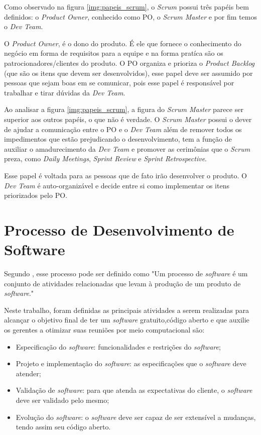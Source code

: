 Como observado na figura \ref{img:papeis_scrum}, o \textit{Scrum} possui três papéis bem definidos: o \textit{Product Owner}, conhecido como PO, o \textit{Scrum Master} e por fim temos o \textit{Dev Team}. 


O \textit{Product Owner}, é o dono do produto. É ele que fornece o conhecimento do negócio em forma de requisitos para a equipe e na forma pratíca são os patrocionadores/clientes do produto. O PO organiza e prioriza o \textit{Product Backlog} (que são os itens que devem ser desenvolvidos), esse papel deve ser assumido por pessoas que sejam boas em se comunicar, pois esse papel é responsável por trabalhar e tirar dúvidas da \textit{Dev Team}.


Ao analisar a figura \ref{img:papeis_scrum}, a figura do \textit{Scrum Master} parece ser superior aos outros papéis, o que não é verdade. O \textit{Scrum Master} possui o dever de ajudar a comunicação entre o PO e o \textit{Dev Team} além de remover todos os impedimentos que estão prejudicando o desenvolvimento, tem a função de auxiliar o amadurecimento da \textit{Dev Team} e promover as cerimônias que o \textit{Scrum} preza, como \textit{Daily Meetings}, \textit{Sprint Review} e \textit{Sprint Retrospective}.


Esse papel é voltada para as pessoas que de fato irão desenvolver o produto. O \textit{Dev Team} é auto-organizável e decide entre si como implementar os itens priorizados pelo PO.

\section{Processo de Desenvolvimento de Software}
\label{sec:processo_de_desenvolvimento_de_software}

Segundo \cite{sommerville}, esse processo pode ser definido como "Um processo de \textit{software} é um conjunto de atividades relacionadas que levam à produção de um produto de \textit{software}."

Neste trabalho, foram definidas as principais atividades a serem realizadas para alcançar o objetivo final de ter um \textit{software} gratuito,código aberto e que auxilie os gerentes a otimizar suas reuniões por meio computacional são:

\begin{itemize}
    \item Especificação do \textit{software}: funcionalidades e restrições do \textit{software};
    \item Projeto e implementação do \textit{software}: as especificações que o \textit{software} deve atender;
    \item Validação de \textit{software}: para que atenda as expectativas do cliente, o \textit{software} deve ser validado pelo mesmo;
    \item Evolução do \textit{software}: o \textit{software} deve ser capaz de ser extensível a mudanças, tendo assim seu código aberto.
\end{itemize}

